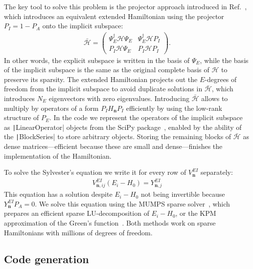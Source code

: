 The key tool to solve this problem is the projector approach introduced in Ref.~\cite{Irfan_2019}, which introduces an equivalent extended Hamiltonian using the projector $P_I = 1 - P_A$ onto the implicit subspace:
%
\begin{align}
\bar{\mathcal{H}} = \begin{pmatrix}
\Psi_E^\dagger \mathcal{H} \Psi_E & \Psi_E^\dagger \mathcal{H} P_I \\
P_I \mathcal{H} \Psi_E & P_I \mathcal{H} P_I
\end{pmatrix}.
\end{align}
%
In other words, the explicit subspace is written in the basis of $\Psi_E$, while the basis of the implicit subspace is the same as the original complete basis of $\mathcal{H}$ to preserve its sparsity.
The extended Hamiltonian projects out the $E$-degrees of freedom from the implicit subspace to avoid duplicate solutions in $\bar{\mathcal{H}}$, which introduces $N_E$ eigenvectors with zero eigenvalues.
Introducing $\bar{\mathcal{H}}$ allows to multiply by operators of a form $P_I H_\mathbf{n} P_I$ efficiently by using the low-rank structure of $P_E$.
In the code we represent the operators of the implicit subspace as \texttt|LinearOperator| objects from the SciPy package~\cite{Virtanen_2020}, enabled by the ability of the \texttt|BlockSeries| to store arbitrary objects.
Storing the remaining blocks of $\bar{\mathcal{H}}$ as dense matrices---efficient because these are small and dense---finishes the implementation of the Hamiltonian.

To solve the Sylvester's equation we write it for every row of $V_{\mathbf{n}}^{EI}$ separately:
%
\begin{align}
V_{\mathbf{n}, ij}^{EI} (E_i - H_0) = Y^{EI}_{\mathbf{n}, j}
\end{align}
%
This equation has a solution despite $E_i - H_0$ not being invertible because $Y^{EI}_{\mathbf{n}} P_A = 0$.
We solve this equation using the MUMPS sparse solver~\cite{Amestoy_2001,Amestoy_2006}, which prepares an efficient sparse LU-decomposition of $E_i - H_0$, or the KPM approximation of the Green's function~\cite{Weisse_2006}.
Both methods work on sparse Hamiltonians with millions of degrees of freedom.

\subsection{Code generation}
\label{sec:codegen}

